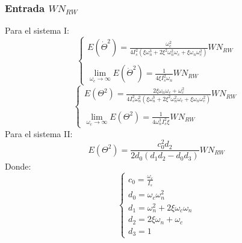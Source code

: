 \documentclass[a4paper,11pt,twoside]{IT-CNEA}
\begin{document}
\subsubsection{Entrada $WN_{RW}$}
Para el sistema I:
\begin{equation}
\begin{cases}
E\left( \dot{\Theta}^2\right)=\frac{\omega_c^2}{4I_s^2\left( \xi\omega_n^3+2\xi^2\omega_n^2\omega_c+\xi\omega_n\omega_c^2 \right)}WN_{RW}
\\
\\
\lim_{\omega_c\to\infty}E\left( \dot{\Theta}^2\right)=\frac{1}{4\xi I_s^2 \omega_n}WN_{RW}
\end{cases}
\label{ec:limiteVelWNRWI}
\end{equation}
\begin{equation}
\begin{cases}
E\left( \Theta^2\right)=\frac{2\xi\omega_n\omega_c+\omega_c^2}{4I_s^2\omega_n^2\left( \xi\omega_n^3+2\xi^2\omega_n^2\omega_c+\xi\omega_n\omega_c^2 \right)}WN_{RW}
\\
\\
\lim_{\omega_c\to\infty}E\left( \Theta^2\right)=\frac{1}{4\omega_n^3 I_s^2\xi}WN_{RW}
\end{cases}
\label{ec:limitePosWNRWI}
\end{equation}
Para el sistema II:
\begin{equation}
E\left( \Theta^2\right)=\frac{c_0^2d_2}{2d_0\left( d_1d_2-d_0d_3\right)} WN_{RW}
\end{equation}
Donde:
\begin{equation}
\begin{cases}
c_0=\frac{\omega_c}{I_s} \\
d_0=\omega_c\omega_n^2 \\
d_1=\omega_n^2+2\xi\omega_c\omega_n \\
d_2=2\xi\omega_n+\omega_c \\
d_3=1
\end{cases}
\end{equation}
\end{document}
